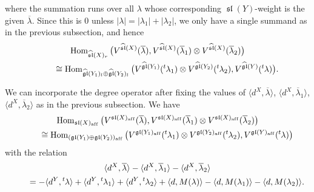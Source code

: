 \documentclass[pdftex]{sigma}
\theoremstyle{definition}
\numberwithin{equation}{section}
\newcommand{\lsp}[2]{{\mskip-.3mu}{}^{#1}\mskip-1mu{#2}}
\newcommand{\algsl}{\operatorname{\mathfrak{sl}}} %
\newcommand{\gl}{\operatorname{\mathfrak{gl}}}
\newcommand{\Hom}{\operatorname{Hom}}
\newcommand{\aff}{\mathrm{af\/f}}
\begin{document}
where the summation runs over all $\lambda$ whose corresponding
$\algsl(Y)$-weight is the given $\overline\lambda$. Since this is $0$
unless $|\lambda| = |\lambda_1|+|\lambda_2|$, we only have a single
summand as in the previous subsection, and hence
\begin{gather*}
  \Hom_{\widehat{\algsl}(X)_r}\big(V^{\widehat{\algsl}(X)}(\overline\lambda),
  V^{\widehat{\algsl}(X)}(\overline\lambda_1)\otimes
  V^{\widehat{\algsl}(X)}(\overline\lambda_2)\big)
\\
 \qquad{} \cong
    \Hom_{\widehat{\gl}(Y_1)_l\oplus\widehat{\gl}(Y_2)_l}
  \big(V^{\widehat{\gl}(Y_1)}(\lsp{t}\lambda_1)
  \otimes V^{\widehat{\gl}(Y_2)}(\lsp{t}\lambda_2),
  V^{\widehat{\gl}(Y)}(\lsp{t}\lambda)\big).
\end{gather*}

We can incorporate the degree operator after f\/ixing the values of
$\langle d^X, \overline{\lambda}\rangle$,
$\langle d^X, \overline{\lambda}_1\rangle$,
$\langle d^X, \overline{\lambda}_2\rangle$
as in the previous subsection. We have
\begin{gather*}
  \Hom_{{\algsl}(X)_\aff}\big(V^{{\algsl}(X)_\aff}(\overline\lambda),
  V^{{\algsl}(X)_\aff}(\overline\lambda_1)\otimes
  V^{{\algsl}(X)_\aff}(\overline\lambda_2)\big)
\\
 \qquad{} \cong
    \Hom_{({\gl}(Y_1)\oplus{\gl}(Y_2))_\aff}
  \big(V^{{\gl}(Y_1)_\aff}(\lsp{t}\lambda_1)
  \otimes V^{{\gl}(Y_2)_\aff}(\lsp{t}\lambda_2),
  V^{{\gl}(Y)_\aff}(\lsp{t}\lambda)\big)
\end{gather*}
with the relation
\begin{gather*}
   \langle d^X, \overline{\lambda}\rangle
   - \langle d^X, \overline{\lambda}_1\rangle
   - \langle d^X, \overline{\lambda}_2\rangle
\\
 \qquad{}  =
   - \langle d^Y, \lsp{t}{\lambda}\rangle
   + \langle d^Y, \lsp{t}{\lambda}_1\rangle
   + \langle d^Y, \lsp{t}{\lambda}_2\rangle
   + \langle d, M(\lambda)\rangle
   - \langle d, M(\lambda_1)\rangle
   - \langle d, M(\lambda_2)\rangle.
\end{gather*}
\end{document}
